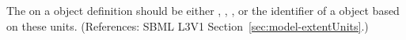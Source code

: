 The  on a \Model object definition should be either
, , ,  or the
identifier of a \UnitDefinition object based on these units.  (References:
SBML L3V1 Section~\ref{sec:model-extentUnits}.)
